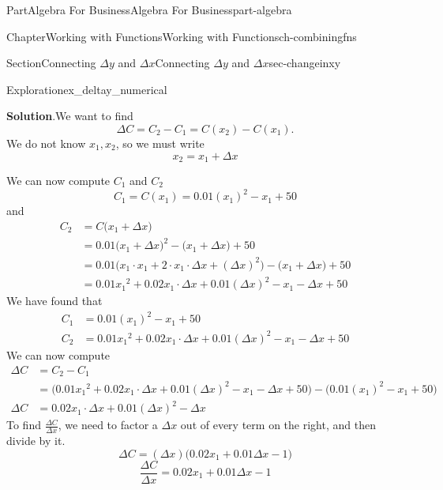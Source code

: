 \documentclass{tufte-book}
\newcommand{\blocktitlefont}{\relax}
\numberwithin{equation}{chapter}
\newcommand{\amp}{&}
\begin{document}
\begin{partptx}{Part}{Algebra For Business}{}{Algebra For Business}{}{}{part-algebra}
\begin{chapterptx}{Chapter}{Working with Functions}{}{Working with Functions}{}{}{ch-combiningfns}
\begin{sectionptx}{Section}{\textasteriskcentered{}Connecting \(\Delta y\) and \(\Delta x\)}{}{\textasteriskcentered{}Connecting \(\Delta y\) and \(\Delta x\)}{}{}{sec-changeinxy}
\begin{exploration}{Exploration}{}{ex_deltay_numerical}
\begin{enumerate}[font=\bfseries,label=(\alph*),ref=\alph*]
\par\smallskip%
\noindent\textbf{\blocktitlefont Solution}.\hypertarget{ex_deltay_numerical-7-2}{}\quad{}We want to find%
\begin{equation*}
\Delta C = C_2 - C_1 = C(x_2) - C(x_1)\text{.}
\end{equation*}
We do not know \(x_1,x_2\), so we must write%
\begin{equation*}
x_2 = x_1 + \Delta x
\end{equation*}
%
\par
We can now compute \(C_1\) and \(C_2\)%
\begin{equation*}
C_1 = C(x_1) = 0.01(x_1)^2 - x_1 + 50 
\end{equation*}
and%
\begin{align*}
C_2 \amp = C\Big(x_1 + \Delta x\Big)\\
\amp = 0.01\Big(x_1 + \Delta x\Big)^2 - \Big(x_1 + \Delta x\Big) + 50 \\
\amp = 0.01\Big(x_1\cdot x_1 + 2\cdot x_1\cdot \Delta x + (\Delta x)^2\Big) - \Big(x_1 + \Delta x\Big) + 50 \\
\amp = 0.01{x_1}^2 + 0.02x_1\cdot \Delta x + 0.01(\Delta x)^2 - x_1 - \Delta x + 50 
\end{align*}
We have found that%
\begin{align*}
C_1 \amp = 0.01(x_1)^2 - x_1 + 50\\
C_2 \amp = 0.01{x_1}^2 + 0.02x_1\cdot \Delta x + 0.01(\Delta x)^2 - x_1 - \Delta x + 50
\end{align*}
We can now compute%
\begin{align*}
\Delta C \amp = C_2 - C_1 \\
\amp = \Big(0.01{x_1}^2 + 0.02x_1\cdot \Delta x + 0.01(\Delta x)^2 - x_1 - \Delta x + 50   \Big) - \Big(0.01(x_1)^2 - x_1 + 50\Big)\\
\Delta C \amp = 0.02x_1\cdot \Delta x + 0.01(\Delta x)^2 - \Delta x   
\end{align*}
To find \(\frac{\Delta C}{\Delta x}\), we need to factor a \(\Delta x\) out of every term on the right, and then divide by it.%
\begin{equation*}
\Delta C  = (\Delta x) \Big( 0.02x_1 + 0.01 \Delta x - 1\Big)  
\end{equation*}
%
\begin{equation*}
\dfrac{\Delta C}{\Delta x}  =  0.02x_1 + 0.01 \Delta x - 1 
\end{equation*}
%
\end{enumerate}%
\end{exploration}%

\end{sectionptx}
\end{chapterptx}
\end{partptx}
\end{document}
